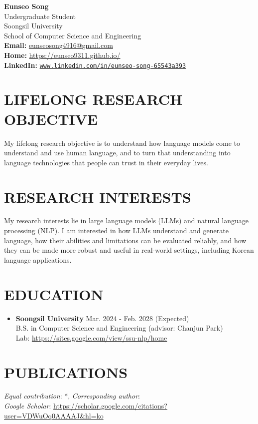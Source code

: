 \documentclass[10pt,a4paper]{article}
\newcommand{\seclabel}[1]{\section*{\uppercase{#1}}}
\newcommand{\cvitem}[2]{\textbf{#1} \hfill \small{#2}\\}
\begin{document}
\begin{center}
    \textbf{\Huge{Eunseo Song}} \\ \vspace{1.0em}
    Undergraduate Student \\
    Soongsil University \\
    School of Computer Science and Engineering \\
    \textbf{Email: }\href{mailto:eunseosong4916@gmail.com}{eunseosong4916@gmail.com} \\
    \textbf{Home: }\url{https://eunseo9311.github.io/} \\
    \textbf{LinkedIn: }\href{https://www.linkedin.com/in/eunseo-song-65543a393/}{\texttt{www.linkedin.com/in/eunseo-song-65543a393}}
\end{center}

\vspace{1em}

\seclabel{Lifelong Research Objective}
\small{My lifelong research objective is to understand how language models come to understand and use human language, and to turn that understanding into language technologies that people can trust in their everyday lives.}

\seclabel{Research Interests}
\small{My research interests lie in large language models (LLMs) and natural language processing (NLP). I am interested in how LLMs understand and generate language, how their abilities and limitations can be evaluated reliably, and how they can be made more robust and useful in real-world settings, including Korean language applications.}

\seclabel{Education}
\begin{itemize}
    \item \cvitem{Soongsil University}{Mar. 2024 - Feb. 2028 (Expected)}
    \small{B.S. in Computer Science and Engineering (advisor: Chanjun Park) \\
    Lab: \url{https://sites.google.com/view/ssu-nlp/home}}
\end{itemize}

\newpage

\seclabel{Publications}
\textit{Equal contribution}: *, \textit{Corresponding author}: \textdagger
\vspace{0.4em} \\
\noindent\textit{Google Scholar}: \url{https://scholar.google.com/citations?user=VDWuOq0AAAAJ&hl=ko}
\end{document}
